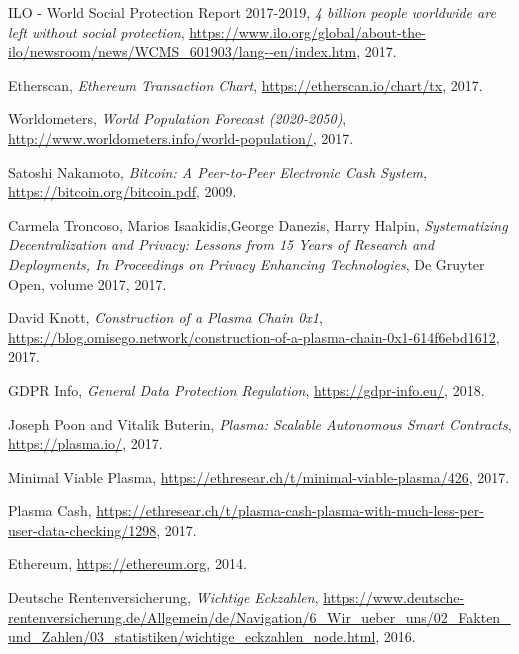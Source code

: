 \begin{thebibliography}{9}

  ILO - World Social Protection Report 2017-2019,
  \textit{4 billion people worldwide are left without social protection},
  \url{https://www.ilo.org/global/about-the-ilo/newsroom/news/WCMS_601903/lang--en/index.htm},
  2017.
  
  Etherscan,
  \textit{Ethereum Transaction Chart},
  \url{https://etherscan.io/chart/tx},
  2017.

  Worldometers,
  \textit{World Population Forecast (2020-2050)},
  \url{http://www.worldometers.info/world-population/},
  2017.  

  Satoshi Nakamoto,
  \textit{Bitcoin: A Peer-to-Peer Electronic Cash System},
  \url{https://bitcoin.org/bitcoin.pdf},
  2009.
  
  Carmela Troncoso, Marios Isaakidis,George Danezis, Harry Halpin,
  \textit{Systematizing Decentralization and Privacy: Lessons from 15 Years of Research and Deployments, In Proceedings on Privacy Enhancing Technologies},
  De Gruyter Open,
  volume 2017,
  2017.

  David Knott,
  \textit{Construction of a Plasma Chain 0x1},
  \url{https://blog.omisego.network/construction-of-a-plasma-chain-0x1-614f6ebd1612},
  2017.
  
  GDPR Info,
  \textit{General Data Protection Regulation},
  \url{https://gdpr-info.eu/},
  2018.  
  
  Joseph Poon and Vitalik Buterin, 
  \textit{Plasma: Scalable Autonomous Smart Contracts},
  \url{https://plasma.io/},
  2017.
  
  Minimal Viable Plasma,
  \url{https://ethresear.ch/t/minimal-viable-plasma/426},
  2017.
  
  Plasma Cash,
  \url{https://ethresear.ch/t/plasma-cash-plasma-with-much-less-per-user-data-checking/1298},
  2017.
  
  Ethereum,
  \url{https://ethereum.org},
  2014.

  Deutsche Rentenversicherung,
  \textit{Wichtige Eckzahlen},
  \url{https://www.deutsche-rentenversicherung.de/Allgemein/de/Navigation/6_Wir_ueber_uns/02_Fakten_und_Zahlen/03_statistiken/wichtige_eckzahlen_node.html},
  2016.


\end{thebibliography}
